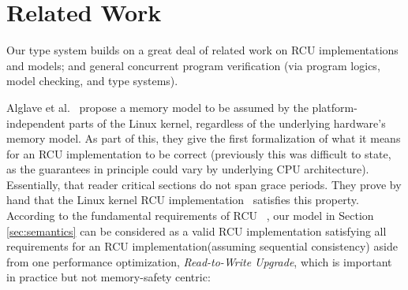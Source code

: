 \section{Related Work}
\label{sec:relatedwork}
Our type system builds on a great deal of related work on RCU implementations and models; and general concurrent program verification (via program logics, model checking, and type systems).

Alglave et al.~\cite{Alglave:2018:FSC:3173162.3177156} propose a memory model to be assumed by the platform-independent parts of the Linux kernel, regardless of the underlying hardware's memory model.
As part of this, they give the first formalization of what it means for an RCU implementation to be correct (previously this was difficult to state, as the guarantees in principle could vary by underlying CPU architecture). Essentially, that reader critical sections do not span grace periods. They prove by hand that the Linux kernel RCU implementation~\cite{DBLP:conf/cav/AlglaveKT13} satisfies this property. According to the fundamental requirements of \textsf{RCU} ~\cite{abssem}, our model in Section \ref{sec:semantics} can be considered as a valid RCU implementation satisfying all requirements for an RCU implementation(assuming sequential consistency) aside from one performance optimization, \textit{Read-to-Write Upgrade}, which is important in practice but not memory-safety centric:
